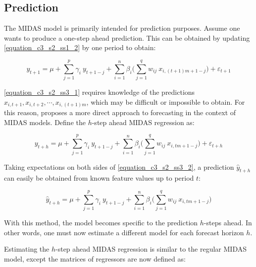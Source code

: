 \subsection{Prediction}
\label{chapter3_section2_subsection3}


The MIDAS model is primarily intended for prediction purposes. Assume one wants to produce a one-step ahead prediction. This can be obtained by updating \ref{equation_c3_s2_ss1_2} by one period to obtain:

\begin{equation}
y_{t+1} = \mu + \sum_{j=1}^{p} \gamma_i \ y_{t+1-j} + \sum_{i=1}^{n} \beta_i \big( \sum_{j=1}^{q}  w_{ij} \  x_{i,(t+1)m+1-j} \big) + \varepsilon_{t+1}
\label{equation_c3_s2_ss3_1}
\end{equation}

\ref{equation_c3_s2_ss3_1} requires knowledge of the predictions $x_{i,t+1}, x_{i,t+2}, \cdots, x_{i,(t+1)m}$, which may be difficult or impossible to obtain. For this reason, \cite{Ghysels2016} proposes a more direct approach to forecasting in the context of MIDAS models. Define the $h$-step ahead MIDAS regression as:

\begin{equation}
y_{t+h} = \mu + \sum_{j=1}^{p} \gamma_i \ y_{t+1-j} + \sum_{i=1}^{n} \beta_i \big( \sum_{j=1}^{q}  w_{ij} \  x_{i,tm+1-j} \big) + \varepsilon_{t+h}
\label{equation_c3_s2_ss3_2}
\end{equation}

Taking expectations on both sides of \ref{equation_c3_s2_ss3_2}, a prediction $\hat{y}_{t+h}$ can easily be obtained from known feature values up to period $t$:

\begin{equation}
\hat{y}_{t+h} = \mu + \sum_{j=1}^{p} \gamma_i \ y_{t+1-j} + \sum_{i=1}^{n} \beta_i \big( \sum_{j=1}^{q}  w_{ij} \  x_{i,tm+1-j} \big)
\label{equation_c3_s2_ss3_3}
\end{equation}

With this method, the model becomes specific to the prediction $h$-steps ahead. In other words, one must now estimate a different model for each forecast horizon $h$.

Estimating the $h$-step ahead MIDAS regression is similar to the regular MIDAS model, except the matrices of regressors are now defined as:

